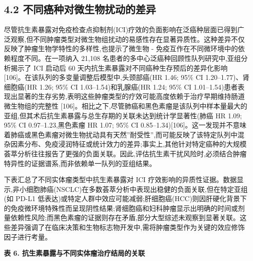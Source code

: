 \subsection{4.2 不同癌种对微生物扰动的差异}\label{ux4e0dux540cux764cux79cdux5bf9ux5faeux751fux7269ux6270ux52a8ux7684ux5deeux5f02}

尽管抗生素暴露对免疫检查点抑制剂(ICI)疗效的负面影响在泛癌种层面已得到广泛观察,但不同肿瘤类型对微生物组扰动的易感性存在显著异质性。这种差异不仅反映了肿瘤生物学特性的多样性,也提示了微生物 - 免疫互作在不同微环境中的依赖程度不同。在一项纳入 21,108 名患者的多中心泛癌种回顾性队列研究中,亚组分析揭示了 ICI 启动后 60 天内抗生素暴露对不同癌种生存预后的差异化影响 {[}106{]}。在该队列的多变量调整后模型中,头颈部癌(HR 1.46; 95\% CI 1.20--1.77)、肾细胞癌(HR 1.26; 95\% CI 1.03--1.54)和乳腺癌(HR 1.24; 95\% CI 1.01--1.54)患者表现出显著的生存劣势,表明这些肿瘤类型的疗效可能高度依赖于治疗早期维持肠道微生物组的完整性 {[}106{]}。相比之下,尽管肺癌和黑色素瘤是该队列中样本量最大的亚组,但其术后抗生素暴露与总生存期的关联未达到统计学显著性(肺癌 HR 1.09; 95\% CI 0.97--1.23,黑色素瘤 HR 1.07; 95\% CI 0.85--1.34){[}106{]}。这一发现并不意味着肺癌或黑色素瘤对微生物扰动具有天然''耐受性'',而可能反映了该特定队列中混杂因素分布、免疫浸润特征或统计效力的差异;事实上,其他针对特定癌种的大规模荟萃分析往往报告了更强的负面关联。因此,评估抗生素干扰风险时,必须结合肿瘤特异性的证据谱系,而非依赖单一队列的亚组结果。

下表汇总了不同实体瘤类型中抗生素暴露对 ICI 疗效影响的异质性证据。数据显示,非小细胞肺癌(NSCLC)在多数荟萃分析中表现出稳健的负面关联,但在特定亚组(如 PD-L1 低表达)或特定人群中效应可能减弱;肝细胞癌(HCC)则因肝硬化背景下的免疫微环境特殊性而呈现阴性结果;肾细胞癌和妇科肿瘤显示出明确的时间或剂量依赖性风险;而黑色素瘤的证据则存在矛盾,部分大型综述未观察到显著关联。这些差异强调了在临床决策和生物标志物开发中,需将肿瘤类型作为关键的效应修饰因子进行考量。

\textbf{表 6. 抗生素暴露与不同实体瘤治疗结局的关联}

